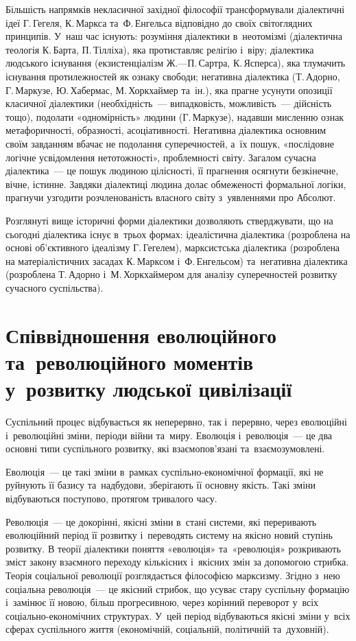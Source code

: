 \documentclass[a5paper,oneside,DIV=12,12pt,headings=small]{scrartcl}
\begin{document}
		Більшість напрямків некласичної західної філософії трансформували діалектичні ідеї Г.\,Гегеля, К.\,Маркса та~Ф.\,Енгельса відповідно до своїх світоглядних принципів. У~наш час існують: розуміння діалектики в~неотомізмі (діалектична теологія К.\,Барта, П.\,Тілліха), яка протиставляє релігію і~віру; діалектика людського існування (екзистенціалізм Ж.—П.\,Сартра, К.\,Ясперса), яка тлумачить існування протилежностей як ознаку свободи; негативна діалектика (Т.\,Адорно, Г.\,Маркузе, Ю.\,Хабермас, М.\,Хоркхаймер та~ін.), яка прагне усунути опозиції класичної діалектики (необхідність~— випадковість, можливість~— дійсність тощо), подолати «одномірність» людини (Г.\,Маркузе), надавши мисленню ознак метафоричності, образності, асоціативності. Негативна діалектика основним своїм завданням вбачає не подолання суперечностей, а~їх пошук, «послідовне логічне усвідомлення нетотожності», проблемності світу. Загалом сучасна діалектика~— це пошук людиною цілісності, її прагнення осягнути безкінечне, вічне, істинне. Завдяки діалектиці людина долає обмеженості формальної логіки, прагнучи узгодити розчленованість власного світу з~уявленнями про Абсолют.
		
		Розглянуті вище історичні форми діалектики дозволяють стверджувати, що на сьогодні діалектика існує в~трьох формах: ідеалістична діалектика (розроблена на основі об'\-єктивного ідеалізму Г.\,Гегелем), марксистська діалектика (розроблена на матеріалістичних засадах К.\,Марксом і~Ф.\,Енгельсом) та~негативна діалектика (розроблена Т.\,Адорно і~М.\,Хоркхаймером для аналізу суперечностей розвитку сучасного суспільства).

	\section{Співвідношення еволюційного та~революційного моментів у~розвитку людської цивілізації}
		Суспільний процес відбувається як неперервно, так і~перервно, через еволюційні і~революційні зміни, періоди війни та~миру. Еволюція і~революція~— це два основні типи суспільного розвитку, які взаємопов'язані та~взаємозумовлені. 
		
		Еволюція~— це такі зміни в~рамках су\-спіль\-но-еко\-но\-міч\-ної формації, які не руйнують її базису та~надбудови, зберігають її основну якість. Такі зміни відбуваються поступово, протягом тривалого часу.
		
		Революція~— це докорінні, якісні зміни в~стані системи, які переривають еволюційний період її розвитку і~переводять систему на якісно новий ступінь розвитку. В теорії діалектики поняття «еволюція» та~«революція» розкривають зміст закону взаємного переходу кількісних і~якісних змін за допомогою стрибка.  Теорія соціальної революції розглядається філософією марксизму. Згідно з~нею соціальна революція~— це якісний стрибок, що усуває стару суспільну формацію і~замінює її новою, більш прогресивною, через корінний переворот у~всіх соціально-економічних структурах. У~цей період відбуваються якісні зміни у~всіх сферах суспільного життя (економічній, соціальній, політичній та~духовній). 
		
\end{document}
